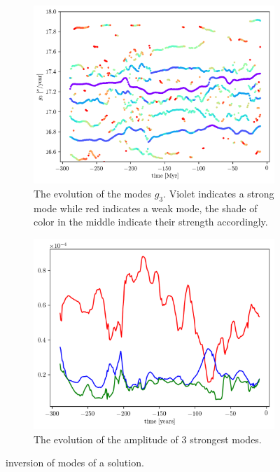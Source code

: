 \documentclass[12pt]{article}
\begin{document}
	\begin{figure}[t]
		\centering
		\begin{subfigure}[t]{0.47\textwidth}
			\centering
			\includegraphics[width=1.0\textwidth]{figures/g3_cont_2944}%
			\caption{The evolution of the modes $g_3$. Violet indicates a strong mode while red indicates a weak mode, the shade of color in the middle indicate their strength accordingly.}
			\label{fig:inv_examplea}
		\end{subfigure}%
		\hfill
		\begin{subfigure}[t]{0.47\textwidth}
			\centering
			\includegraphics[width=1.0\textwidth]{figures/Amp_g3_2944}%
			\caption{The evolution of the amplitude of 3 strongest modes.}
			\label{fig:inv_exampleb}
		\end{subfigure}
		\caption{inversion of modes of a solution.}
		\label{fig:inv_example}
	\end{figure}
\end{document}
